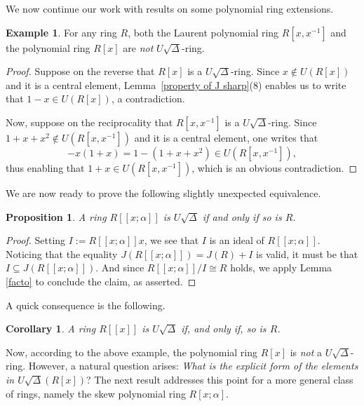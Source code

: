 \documentclass[11pt]{amsart}
\newtheorem{proposition}[theorem]{Proposition}
\newtheorem{corollary}[theorem]{Corollary}
\theoremstyle{definition}
\newtheorem{example}[theorem]{Example}
\begin{document}

We now continue our work with results on some polynomial ring extensions.

\begin{example}\label{laurent}
For any ring $R$, both the Laurent polynomial ring $R[x, x^{-1}]$ and the polynomial ring $R[x]$ are {\it not} $U\sqrt{\Delta}$-ring.
\end{example}

\begin{proof}
Suppose on the reverse that $R[x]$ is a $U\sqrt{\Delta}$-ring. Since $x \not\in U(R[x])$ and it is a central element, Lemma~\ref{property of J sharp}(8) enables us to write that $1-x \in U(R[x])$, a contradiction.

Now, suppose on the reciprocality that $R[x, x^{-1}]$ is a $U\sqrt{\Delta}$-ring. Since $1+x+x^2 \not\in U(R[x, x^{-1}])$ and it is a central element, one writes that $$-x(1+x)=1-(1+x+x^2) \in U(R[x, x^{-1}]),$$ thus enabling that $1+x \in U(R[x, x^{-1}])$, which is an obvious contradiction.
\end{proof}

We are now ready to prove the following slightly unexpected equivalence.

\begin{proposition}\label{3.2}
A ring $R[[x; \alpha]]$ is $U\sqrt{\Delta}$ if and only if so is $R$.
\end{proposition}

\begin{proof}
Setting $I:= R[[x; \alpha]]x$, we see that $I$ is an ideal of $R[[x; \alpha]]$. Noticing that the equality $J(R[[x; \alpha]])=J(R)+I$ is valid, it must be that $I\subseteq J(R[[x; \alpha]])$. And since $R[[x; \alpha]]/I\cong R$ holds, we apply Lemma \ref{facto} to conclude the claim, as asserted.
\end{proof}

A quick consequence is the following.

\begin{corollary}\label{power}
A ring $R[[x]]$ is $U\sqrt{\Delta}$ if, and only if, so is $R$.
\end{corollary}


Now, according to the above example, the polynomial ring \( R[x] \) is {\it not} a \( U\sqrt{\Delta} \)-ring. However, a natural question arises: {\it What is the explicit form of the elements in \( U\sqrt{\Delta}(R[x]) \)}?  The next result addresses this point for a more general class of rings, namely the skew polynomial ring \( R[x; \alpha] \).
\end{document}
